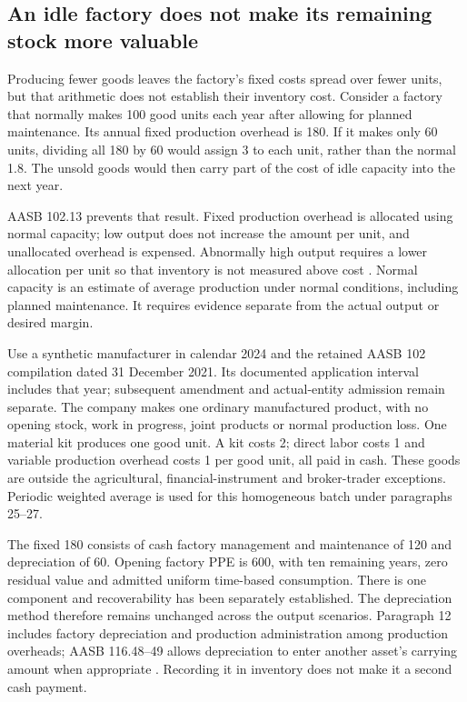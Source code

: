 \subsection{An idle factory does not make its remaining stock more valuable}
\label{sec:production-capacity-cost}

Producing fewer goods leaves the factory's fixed costs spread over fewer
units, but that arithmetic does not establish their inventory cost. Consider
a factory that normally makes 100 good units each year after allowing for
planned maintenance. Its annual fixed production overhead is 180. If it
makes only 60 units, dividing all 180 by 60 would assign 3 to each unit,
rather than the normal 1.8. The unsold goods would then carry part of the
cost of idle capacity into the next year.

AASB 102.13 prevents that result. Fixed production overhead is allocated
using normal capacity; low output does not increase the amount per unit,
and unallocated overhead is expensed. Abnormally high output requires a
lower allocation per unit so that inventory is not measured above cost
\citep{aasb102compiled2021}. Normal capacity is an estimate of average
production under normal conditions, including planned maintenance. It
requires evidence separate from the actual output or desired margin.

Use a synthetic manufacturer in calendar 2024 and the retained AASB 102
compilation dated 31 December 2021. Its documented application interval
includes that year; subsequent amendment and actual-entity admission remain
separate. The company makes one ordinary manufactured product, with no
opening stock, work in progress, joint products or normal production loss.
One material kit produces one good unit. A kit costs 2; direct labor costs
1 and variable production overhead costs 1 per good unit, all paid in cash.
These goods are outside the agricultural, financial-instrument and
broker-trader exceptions. Periodic weighted average is used for this
homogeneous batch under paragraphs 25--27.

The fixed 180 consists of cash factory management and maintenance of 120
and depreciation of 60. Opening factory PPE is 600, with ten remaining
years, zero residual value and admitted uniform time-based consumption.
There is one component and recoverability has been separately established.
The depreciation method therefore remains unchanged across the output
scenarios. Paragraph 12 includes factory depreciation and production
administration among production overheads; AASB 116.48--49 allows
depreciation to enter another asset's carrying amount when appropriate
\citep{aasb116dated}. Recording it in inventory does not make it a second
cash payment.

